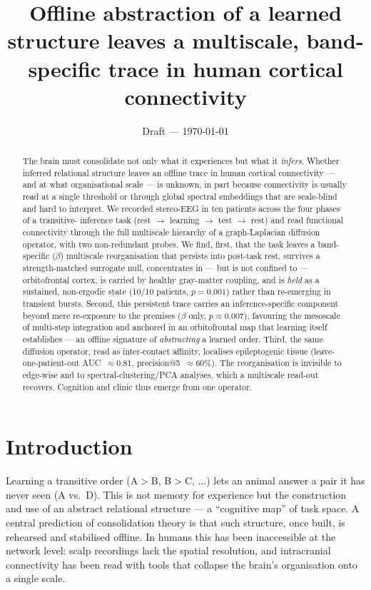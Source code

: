 \documentclass[11pt]{article}
\title{Offline abstraction of a learned structure leaves a multiscale,
band-specific trace in human cortical connectivity}
\author{\TODO{author list}}
\date{Draft --- \today}
\begin{document}
\maketitle

\begin{abstract}
\noindent
The brain must consolidate not only what it experiences but what it
\emph{infers}. Whether inferred relational structure leaves an offline trace in
human cortical connectivity --- and at what organisational scale --- is unknown,
in part because connectivity is usually read at a single threshold or through
global spectral embeddings that are scale-blind and hard to interpret. We
recorded stereo-EEG in ten patients across the four phases of a transitive-
inference task (rest $\rightarrow$ learning $\rightarrow$ test $\rightarrow$ rest)
and read functional connectivity through the full multiscale hierarchy of a
graph-Laplacian diffusion operator, with two non-redundant probes. We find,
first, that the task leaves a band-specific ($\beta$) multiscale reorganisation
that persists into post-task rest, survives a strength-matched surrogate null,
concentrates in --- but is not confined to --- orbitofrontal cortex, is carried
by healthy gray-matter coupling, and is \emph{held} as a sustained, non-ergodic
state (10/10 patients, $p=0.001$) rather than re-emerging in transient bursts.
Second, this persistent trace carries an inference-specific component beyond mere
re-exposure to the premises ($\beta$ only, $p\approx0.007$), favouring the
mesoscale of multi-step integration and anchored in an orbitofrontal map that
learning itself establishes --- an offline signature of \emph{abstracting} a
learned order. Third, the same diffusion operator, read as inter-contact
affinity, localises epileptogenic tissue (leave-one-patient-out
AUC~$\approx0.81$, precision@5~$\approx60\%$). The reorganisation is invisible to
edge-wise and to spectral-clustering/PCA analyses, which a multiscale read-out
recovers. Cognition and clinic thus emerge from one operator.
\end{abstract}

\section{Introduction}

Learning a transitive order (A$>$B, B$>$C, $\dots$) lets an animal answer a pair
it has never seen (A vs.\ D). This is not memory for experience but the
construction and use of an abstract relational structure --- a ``cognitive
map'' of task space. A central prediction of consolidation theory is that such
structure, once built, is rehearsed and stabilised offline. In humans this has
been inaccessible at the network level: scalp recordings lack the spatial
resolution, and intracranial connectivity has been read with tools that collapse
the brain's organisation onto a single scale.
\end{document}
